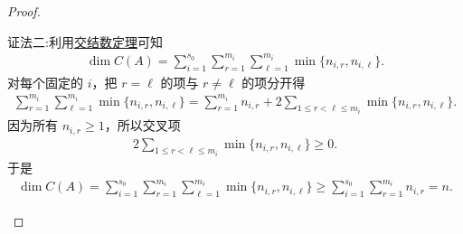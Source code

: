 \documentclass[../../main.tex]{subfiles}%
\begin{document}
\begin{proof}
\begin{enumerate}[(1)]
{\color{blue}证法二:}利用\hyperref[theorem:AX-XB相关命题3]{交结数定理}可知
\begin{align*}
\dim C(A) = \sum_{i = 1}^{s_0}\sum_{r = 1}^{m_i}\sum_{\ell = 1}^{m_i}\min\{n_{i,r}, n_{i,\ell}\}.
\end{align*}
对每个固定的 $i$，把 $r=\ell$ 的项与 $r\ne \ell$ 的项分开得
\begin{align*}
\sum\limits_{r=1}^{m_i}\sum\limits_{\ell=1}^{m_i}
\min\{n_{i,r},n_{i,\ell}\}
=
\sum\limits_{r=1}^{m_i} n_{i,r}
+
2\sum\limits_{1\le r<\ell\le m_i}
\min\{n_{i,r},n_{i,\ell}\}.
\end{align*}
因为所有 $n_{i,r}\geqslant 1$，所以交叉项
\begin{align*}
2\sum\limits_{1\le r<\ell\le m_i}
\min\{n_{i,r},n_{i,\ell}\}
\geqslant 0.
\end{align*}
于是
\begin{align*}
\dim C(A) = \sum_{i = 1}^{s_0}\sum_{r = 1}^{m_i}\sum_{\ell = 1}^{m_i}\min\{n_{i,r}, n_{i,\ell}\}\geqslant \sum\limits_{i=1}^{s_0}\sum\limits_{r=1}^{m_i} n_{i,r}=n.
\end{align*}
\end{enumerate}
\end{proof}
\end{document}
